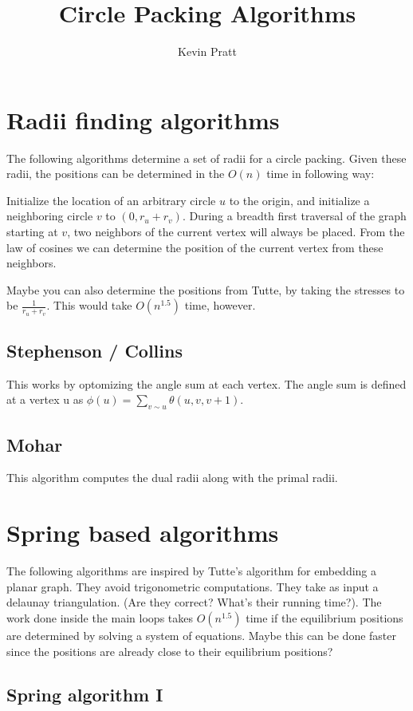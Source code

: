 \documentclass{article}
\title{Circle Packing Algorithms}
\author{Kevin Pratt}
\begin{document}
\section{Radii finding algorithms}


The following algorithms determine a set of radii for a circle packing. Given these radii, the positions can be determined in the $O(n)$ time in following way:

Initialize the location of an arbitrary circle $u$ to the origin, and initialize a neighboring circle $v$ to $(0,r_u + r_v)$.
During a breadth first traversal of the graph starting at $v$, two neighbors of the current vertex will always be placed. From the law of cosines we can determine the position of the current vertex from these neighbors.

Maybe you can also determine the positions from Tutte, by taking the stresses to be $\frac{1}{r_u+r_v}$. This would take $O(n^{1.5})$ time, however.

\subsection{Stephenson / Collins}

This works by optomizing the angle sum at each vertex. The angle sum is defined at a vertex u as $\phi(u) = \sum_{v \sim u}^{} \theta(u, v, v+1)$.


\subsection{Mohar}
This algorithm computes the dual radii along with the primal radii.
\section{Spring based algorithms}

The following algorithms are inspired by Tutte's algorithm for embedding a planar graph. They avoid trigonometric computations. They take as input a delaunay triangulation. (Are they correct? What's their running time?). The work done inside the main loops takes $O(n^{1.5})$ time if the equilibrium positions are determined by solving a system of equations. Maybe this can be done faster since the positions are already close to their equilibrium positions?

\subsection{Spring algorithm I}
\end{document}
